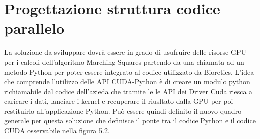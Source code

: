 \documentclass[12pt,a4paper]{report}
\begin{document}
\newpage
\section{Progettazione struttura codice parallelo}
La soluzione da sviluppare dovrà essere in grado di usufruire delle risorse GPU per i calcoli dell'algoritmo Marching Squares partendo da una chiamata ad un metodo Python per poter essere integrato al codice utilizzato da Bioretics. \newline
L'idea che comprende l'utilizzo delle API CUDA-Python è di creare un modulo python richiamabile dal codice dell'azieda che tramite le le API dei Driver Cuda riesca a caricare i dati, lanciare i kernel e recuperare il riusltato dalla GPU per poi restituirlo all'applicazione Python. \newline
Può essere quindi definito il nuovo quadro generale per questa soluzione che definisce il ponte tra il codice Python e il codice CUDA osservabile nella figura 5.2. \\[10pt]

\begin{figure}[H]
\centering
\begin{floatrow}[1]
\end{floatrow}
\end{figure} \newpage
\end{document}
